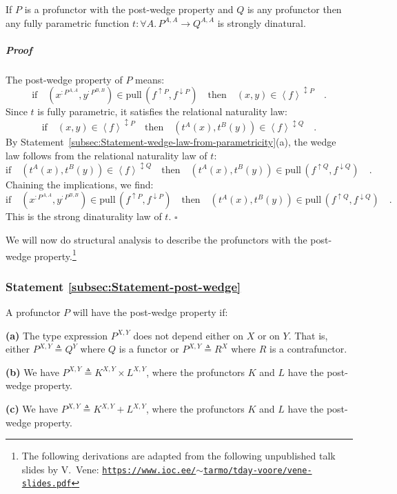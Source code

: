 If $P$ is a profunctor with the post-wedge property and $Q$ is any
profunctor then any fully parametric function $t:\forall A.\,P^{A,A}\rightarrow Q^{A,A}$
is strongly dinatural.

\subparagraph{Proof}

The post-wedge property of $P$ means:
\[
\text{if}\quad(x^{:P^{A,A}},y^{:P^{B,B}})\in\text{pull}\,(f^{\uparrow P},f^{\downarrow P})\quad\text{then}\quad(x,y)\in\left<f\right>^{\updownarrow P}\quad.
\]
Since $t$ is fully parametric, it satisfies the relational naturality
law:
\[
\text{if}\quad(x,y)\in\left<f\right>^{\updownarrow P}\quad\text{then}\quad(t^{A}(x),t^{B}(y))\in\left<f\right>^{\updownarrow Q}\quad.
\]
By Statement~\ref{subsec:Statement-wedge-law-from-parametricity}(a),
the wedge law follows from the relational naturality law of $t$:
\[
\text{if}\quad(t^{A}(x),t^{B}(y))\in\left<f\right>^{\updownarrow Q}\quad\text{then}\quad(t^{A}(x),t^{B}(y))\in\text{pull}\,(f^{\uparrow Q},f^{\downarrow Q})\quad.
\]
Chaining the implications, we find:
\[
\text{if}\quad(x^{:P^{A,A}},y^{:P^{B,B}})\in\text{pull}\,(f^{\uparrow P},f^{\downarrow P})\quad\text{then}\quad(t^{A}(x),t^{B}(y))\in\text{pull}\,(f^{\uparrow Q},f^{\downarrow Q})\quad.
\]
This is the strong dinaturality law of $t$. $\square$

We will now do structural analysis to describe the profunctors with
the post-wedge property.\footnote{The following derivations are adapted from the following unpublished
talk slides by V.~Vene: \texttt{\href{https://www.ioc.ee/~tarmo/tday-voore/vene-slides.pdf}{https://www.ioc.ee/$\sim$tarmo/tday-voore/vene-slides.pdf}}} 

\subsubsection{Statement \label{subsec:Statement-post-wedge}\ref{subsec:Statement-post-wedge}}

A profunctor $P$ will have the post-wedge property if:

\textbf{(a)} The type expression $P^{X,Y}$ does not depend either
on $X$ or on $Y$. That is, either $P^{X,Y}\triangleq Q^{Y}$ where
$Q$ is a functor or $P^{X,Y}\triangleq R^{X}$ where $R$ is a contrafunctor. 

\textbf{(b)} We have $P^{X,Y}\triangleq K^{X,Y}\times L^{X,Y}$, where
the profunctors $K$ and $L$ have the post-wedge property.

\textbf{(c)} We have $P^{X,Y}\triangleq K^{X,Y}+L^{X,Y}$, where the
profunctors $K$ and $L$ have the post-wedge property.

